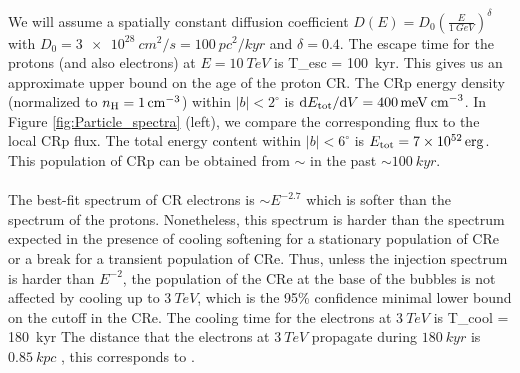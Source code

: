 We will assume a spatially constant diffusion coefficient $D(E) = D_0\left(\frac{E}{\SI{1}{GeV}}\right)^\delta$ with $D_0 = \SI{3e28}{cm^2/s} = \SI{100}{pc^2/kyr}$ and $\delta = 0.4$.
The escape time for the protons (and also electrons) at $E = \SI{10}{TeV}$ is 
\be
T_{\rm esc} =  \approx \SI{100}{kyr}.
\ee
{} 
This gives us an approximate upper bound on the age of the proton CR.
The CRp energy density (normalized to $n_{\text{H}} = \SI{1}{cm^{-3}}$) within $|b| < 2^\circ$ is 
$\text{d} E_{\text{tot}} / \text{d} V = \SI{400}{meV\: cm^{-3}}$.
In Figure \ref{fig:Particle_spectra} (left), we compare the corresponding flux to the local CRp flux.
The total energy content within $|b| < 6^\circ$ is $E_{\text{tot}} = \SI{7e52}{erg}$.
This population of CRp can be obtained from $\sim$  in the past $\sim \SI{100}{kyr}$. 
 \\
\\


The best-fit spectrum of CR electrons is $\sim E^{-2.7}$ which is softer than the spectrum of the protons.
Nonetheless, this spectrum is harder than the spectrum expected in the presence of cooling softening
for a stationary population of CRe or a break for a transient population of CRe.
Thus, unless the injection spectrum is harder than $E^{-2}$, the population of the CRe at the base of the 
bubbles is not affected by cooling up to $\SI{3}{TeV}$,
which is the 95\% confidence minimal lower bound on the cutoff in the CRe. 
The cooling time for the electrons at $\SI{3}{TeV}$ is
\be
T_{\rm cool} = \SI{180}{kyr}
\ee
{} The distance that the electrons at $\SI{3}{TeV}$ propagate during $\SI{180}{kyr}$ is $\SI{0.85}{kpc}$ 
 , 
this corresponds to .

